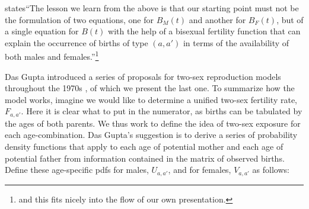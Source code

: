 \FloatBarrier
\label{sec:dasgupta}
\citet{gupta1978alternative} states``The lesson we learn from the above is that our
starting point must not be the formulation of two equations, one for $B_M(t)$ and another for
$B_F(t)$, but of a single equation for $B(t)$ with the help of a bisexual
fertility function that can explain the occurrence of births of type $(a,a')$ in
terms of the availability of both males and females.''\footnote{and this fits
nicely into the flow of our own presentation.} 

Das Gupta introduced a series of proposals for two-sex reproduction models
throughout the 1970s \citep{gupta1972two, gupta1973us,
gupta1976interactive, gupta1978alternative}, of which we present the last
one. To summarize how the model works, imagine we would like to determine a
unified two-sex fertility rate, $F_{a,a'}$. Here it is clear
what to put in the numerator, as births can be tabulated by the ages of both parents.
 We thus work to define the idea of two-sex exposure for each age-combination. Das Gupta's
suggestion is to derive a series of probability density functions that apply to
each age of potential mother and each age of potential father from information
contained in the matrix of observed births. Define these age-specific pdfs for
males, $U_{a,a'}$, and for females, $V_{a,a'}$ as follows:

